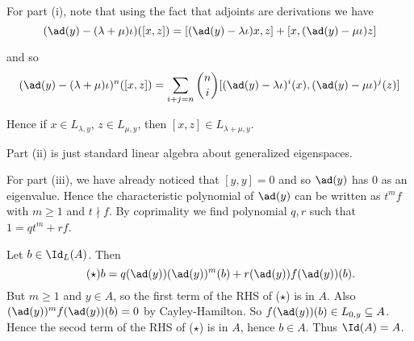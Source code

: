 For part (i), note that using the fact that adjoints are
derivations we have
\[ (\ad(y) - (\lambda+\mu)\iota)([x, z]) = [(\ad(y) - \lambda\iota)x, z] +
		[x, (\ad(y)-\mu\iota)z] \]

and so
\[ (\ad(y) - (\lambda + \mu)\iota)^n([x, z]) = \sum_{i + j = n}\binom{n}{i}[(\ad(y) - \lambda\iota)^i(x), (\ad(y) - \mu\iota)^j(z)] \]

Hence if $x \in L_{\lambda, y}$, $z \in L_{\mu, y}$, then
$[x, z] \in L_{\lambda + \mu, y}$.

Part (ii) is just standard linear algebra about generalized eigenspaces.

For part (iii), we have already noticed that $[y, y] = 0$ and so $\ad(y)$
has $0$ as an eigenvalue. Hence the characteristic polynomial of $\ad(y)$ can
be written as $t^mf$ with $m\geq 1$ and $t\nmid f$. By coprimality we find
polynomial $q, r$ such that $1 = qt^m + rf$.

Let $b \in \Id_L(A)$. Then
\begin{equation*}\tag{$\star$}
b = q(\ad(y))(\ad(y))^m(b) + r(\ad(y))f(\ad(y))(b).
\end{equation*}
But $m\geq 1$ and $y \in A$, so the first term of the RHS of ($\star$) is in $A$.
Also $(\ad(y))^mf(\ad(y))(b) = 0$ by Cayley-Hamilton. So
$f(\ad(y))(b) \in L_{0, y} \subseteq A$. Hence the secod term of the RHS of
($\star$) is in $A$, hence $b \in A$. Thus $\Id(A) = A$.
